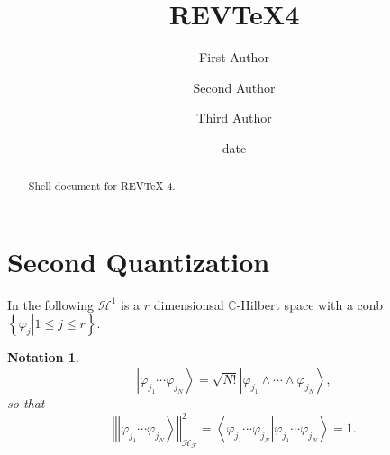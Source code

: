 \documentclass[aps,preprint]{revtex4}%
\newtheorem{notation}[theorem]{Notation}
\begin{document}
\title[Short title for running header]{REV\TeX4}
\author{First Author}
\author{Second Author}
\author{Third Author}

\begin{abstract}
Shell document for REV\TeX{} 4.

\end{abstract}
\date[Date text]{date}




\maketitle
\tableofcontents


\section{Second Quantization}

In the following $\mathcal{H}^{1}$ is a $r$ dimensionsal $\mathbb{C}$-Hilbert
space with a conb $\left\{  \left.  \varphi_{j}\right\vert 1\leq j\leq
r\right\}  .$

\begin{notation}%
\begin{equation}
\left\vert \varphi_{j_{1}}\cdots\varphi_{j_{N}}\right\rangle =\sqrt
{N!}\left\vert \varphi_{j_{1}}\wedge\cdots\wedge\varphi_{j_{N}}\right\rangle ,
\end{equation}
so that
\begin{equation}
\left\Vert \left\vert \varphi_{j_{1}}\cdots\varphi_{j_{N}}\right\rangle
\right\Vert _{\mathcal{H}_{\mathcal{F}}}^{2}=\left\langle \left.
\varphi_{j_{1}}\cdots\varphi_{j_{N}}\right\vert \varphi_{j_{1}}\cdots
\varphi_{j_{N}}\right\rangle =1.
\end{equation}

\end{notation}
\end{document}
